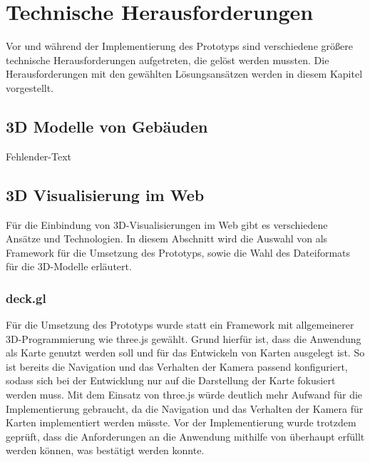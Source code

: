 \newpage
\section{Technische Herausforderungen}
Vor und während der Implementierung des Prototyps sind verschiedene größere technische Herausforderungen aufgetreten, die gelöst werden mussten. Die Herausforderungen mit den gewählten Lösungsansätzen werden in diesem Kapitel vorgestellt. 

\subsection{3D Modelle von Gebäuden}
Fehlender-Text

\subsection{3D Visualisierung im Web}
Für die Einbindung von 3D-Visualisierungen im Web gibt es verschiedene Ansätze und Technologien. In diesem Abschnitt wird die Auswahl von \deckgl{} als Framework für die Umsetzung des Prototyps, sowie die Wahl des Dateiformats für die 3D-Modelle erläutert.

\subsubsection{deck.gl}
Für die Umsetzung des Prototyps wurde \deckgl{} statt ein Framework mit allgemeinerer 3D-Programmierung wie three.js gewählt. Grund hierfür ist, dass die Anwendung als Karte genutzt werden soll und \deckgl{} für das Entwickeln von Karten ausgelegt ist. So ist bereits die Navigation und das Verhalten der Kamera passend konfiguriert, sodass sich bei der Entwicklung nur auf die Darstellung der Karte fokusiert werden muss. Mit dem Einsatz von three.js würde deutlich mehr Aufwand für die Implementierung gebraucht, da die Navigation und das Verhalten der Kamera für Karten implementiert werden müsste. Vor der Implementierung wurde trotzdem geprüft, dass die Anforderungen an die Anwendung mithilfe von \deckgl{} überhaupt erfüllt werden können, was bestätigt werden konnte.

